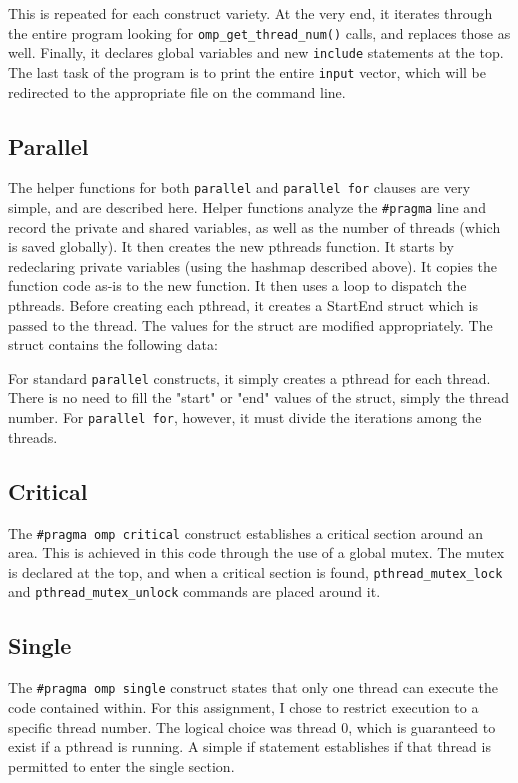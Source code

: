 \documentclass[]{article}
\begin{document}
This is repeated for each construct variety. At the very end, it iterates through the entire program looking for \texttt{omp\_get\_thread\_num()} calls, and replaces those as well. Finally, it declares global variables and new \texttt{include} statements at the top. The last task of the program is to print the entire \texttt{input} vector, which will be redirected to the appropriate file on the command line.

\subsection{Parallel}
The helper functions for both \texttt{parallel} and \texttt{parallel for} clauses are very simple, and are described here. Helper functions analyze the \texttt{\#pragma} line and record the private and shared variables, as well as the number of threads (which is saved globally). It then creates the new pthreads function. It starts by redeclaring private variables (using the hashmap described above). It copies the function code as-is to the new function. It then uses a loop to dispatch the pthreads.
\newline \newline
Before creating each pthread, it creates a StartEnd struct which is passed to the thread. The values for the struct are modified appropriately. The struct contains the following data:
\newline


For standard \texttt{parallel} constructs, it simply creates a pthread for each thread. There is no need to fill the "start" or "end" values of the struct, simply the thread number. For \texttt{parallel for}, however, it must divide the iterations among the threads.

\subsection{Critical}
The \texttt{\#pragma omp critical} construct establishes a critical section around an area. This is achieved in this code through the use of a global mutex. The mutex is declared at the top, and when a critical section is found, \texttt{pthread\_mutex\_lock} and \texttt{pthread\_mutex\_unlock} commands are placed around it.

\subsection{Single}
The \texttt{\#pragma omp single} construct states that only one thread can execute the code contained within. For this assignment, I chose to restrict execution to a specific thread number. The logical choice was thread 0, which is guaranteed to exist if a pthread is running. A simple if statement establishes if that thread is permitted to enter the single section.
\end{document}
